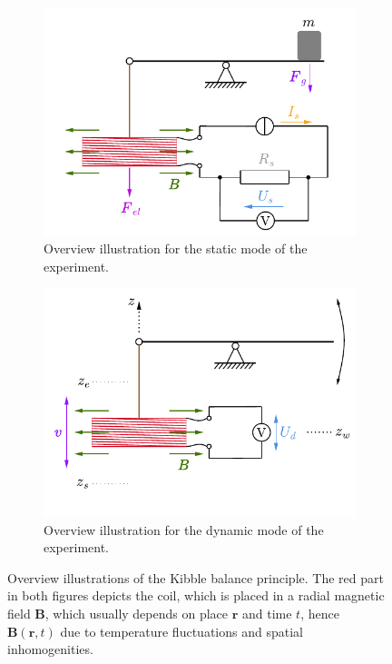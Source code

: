 \documentclass{report}
\numberwithin{tm}{section}
\newcommand\vect[1]{\ensuremath{\bm{#1}}}
\begin{document}
	\begin{figure}[h]
		\centering
		\begin{subfigure}{0.49\textwidth}
			\centering
			\includegraphics[width=\textwidth]{figures/balancestatic.pdf}
			\caption{Overview illustration for the static mode of the experiment.}
			\label{fig:balancestatic}
		\end{subfigure}
		\hfill
		\begin{subfigure}{0.49\textwidth}
			\centering
			\includegraphics[width=\textwidth]{figures/balancedynamic.pdf}
			\caption{Overview illustration for the dynamic mode of the experiment.}
			\label{fig:balancedynamic}
		\end{subfigure}
		\caption{Overview illustrations of the Kibble balance principle. The red part in both figures depicts the coil, which is placed in a radial magnetic field $\vect{B}$, which usually depends on place $\vect{r}$ and time $t$, hence $\vect{B}(\vect{r},t)$ due to temperature fluctuations and spatial inhomogenities.}
	\end{figure}
	
\end{document}

